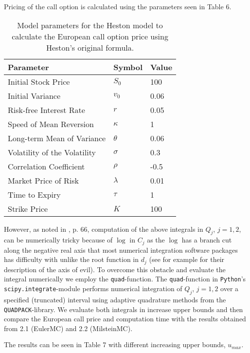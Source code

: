 \documentclass[11pt]{article}
\numberwithin{equation}{section}
\begin{document}
\newpage
Pricing of the call option is calculated using the parameters
seen in
Table 6.
\begin{table}[!h]
    \centering
    \begin{tabular}{lll}
    \toprule
    \textbf{Parameter} & \textbf{Symbol} & \textbf{Value} \\
    \midrule
    Initial Stock Price & $S_0$ & 100 \\
    Initial Variance & $v_0$ & 0.06 \\
    Risk-free Interest Rate & $r$ & 0.05 \\
    Speed of Mean Reversion & $\kappa$ & 1 \\
    Long-term Mean of Variance & $\theta$ & 0.06 \\
    Volatility of the Volatility & $\sigma$ & 0.3 \\
    Correlation Coefficient & $\rho$ & -0.5 \\
    Market Price of Risk & $\lambda$ & 0.01 \\
    Time to Expiry & $\tau$ & 1 \\
    Strike Price & $K$ & 100 \\
    \bottomrule
    \end{tabular}
    \caption{Model parameters for the Heston model to calculate the European call option price using Heston's original formula.}
    \label{table:call_option_pricing_parameters3}
    \end{table}

However, as noted in \cite{Havrylenko2024}, p. 66, computation of the above
integrals in $Q_j$, $j=1,2$, can be numerically tricky because of $\log$ in
$C_j$ as the $\log$ has a branch cut along the negative real
axis that most numerical integration software packages has difficulty with unlike the
root function in $d_j$ (see for example \cite{Albrecher2006LittleHeston} for
their description of the axis of evil). To overcome this obstacle and evaluate the integral numerically
we employ the \texttt{quad}-function. The \texttt{quad}-function in
\texttt{Python}'s \texttt{scipy.integrate}-module \cite{2020SciPy-NMeth} performs numerical integration
of $Q_j$, $j=1,2$ over a specified (truncated) interval  using adaptive quadrature methods
from the \texttt{QUADPACK}-library. We evaluate both integrals in increase upper
bounds and then compare the European call price and computation time with the
results obtained from 2.1 (EulerMC) and 2.2 (MilsteinMC).

The results can be seen in Table 7 with different increasing upper bounds, $u_{max}$.
\end{document}
